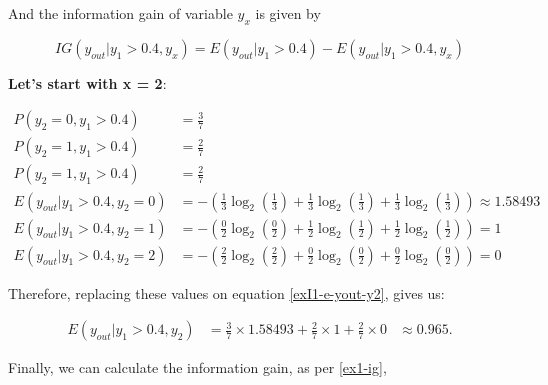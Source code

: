 \documentclass[12pt]{article}
\begin{document}
\begin{enumerate}[leftmargin=\labelsep]
    And the information gain of variable $y_x$ is given by

    \begin{equation}\label{ex1-ig}
        IG(y_{out} |y_1 > 0.4, y_x) = E(y_{out} |y_1 > 0.4) - E(y_{out} |y_1 > 0.4, y_x)
    \end{equation}

    \textbf{Let's start with x = 2}:

    \[
        \begin{aligned}
            P(y_2 = 0, y_1 > 0.4)          & = \frac{3}{7}                                                                                       \\
            P(y_2 = 1, y_1 > 0.4)          & = \frac{2}{7}                                                                                       \\
            P(y_2 = 1, y_1 > 0.4)          & = \frac{2}{7}                                                                                       \\
            E(y_{out} | y_1 > 0.4 , y_2 = 0) & = - \left(\frac{1}{3} \log_2\left(\frac{1}{3}\right) + \frac{1}{3} \log_2\left(\frac{1}{3}\right)
                + \frac{1}{3} \log_2\left(\frac{1}{3}\right)\right) \approx 1.58493                                                              \\
            E(y_{out} | y_1 > 0.4 , y_2 = 1) & = - \left(\frac{0}{2} \log_2\left(\frac{0}{2}\right) + \frac{1}{2} \log_2\left(\frac{1}{2}\right)
                + \frac{1}{2} \log_2\left(\frac{1}{2}\right)\right) = 1                                                                          \\
            E(y_{out} | y_1 > 0.4 , y_2 = 2) & = - \left(\frac{2}{2} \log_2\left(\frac{2}{2}\right) + \frac{0}{2} \log_2\left(\frac{0}{2}\right)
                + \frac{0}{2} \log_2\left(\frac{0}{2}\right)\right) = 0
        \end{aligned}
    \]

    Therefore, replacing these values on equation \eqref{exI1-e-yout-y2}, gives us:

    \[
        \begin{aligned}
            E(y_{out} | y_1>0.4, y_2) & = \frac{3}{7} \times 1.58493 + \frac{2}{7} \times 1 + \frac{2}{7} \times 0 & \approx 0.965.
        \end{aligned}
    \]

    Finally, we can calculate the information gain, as per \eqref{ex1-ig},


\end{enumerate}
\end{document}
